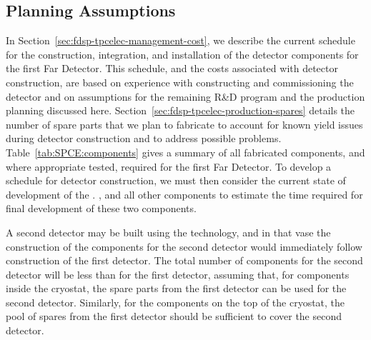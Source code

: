 \subsection{Planning Assumptions}
\label{sec:fdsp-tpcelec-management-planning}

In Section~\ref{sec:fdsp-tpcelec-management-cost}, we describe
the current schedule for the construction, integration, and installation
of the  detector components for the first   Far Detector. This schedule, and the costs associated
with detector construction, are based on experience with constructing and commissioning the 
detector and on assumptions for the remaining R\&D program
and the production planning discussed here. 
Section~\ref{sec:fdsp-tpcelec-production-spares} details
the number of spare parts that we plan to fabricate to
account for known yield issues during detector construction
and to address possible problems. Table~\ref{tab:SPCE:components}
gives a summary of all fabricated components, and where
appropriate tested, required for the first 
 Far Detector. To develop a schedule for detector construction, 
we must then consider the current state of development of 
the . , and all other components to 
estimate the time required for final development of these
two components.

A second detector may be built using the  technology, 
and in that vase the construction of the  components 
for the second detector would immediately follow construction of 
the first detector. The total number of components for the second 
detector will be less than for the first detector, assuming that, 
for components inside the cryostat, the spare parts from the first 
detector can be used for the second detector. Similarly, for the 
components on the top of the cryostat, the
pool of spares from the first detector should be sufficient to cover
the second detector.


